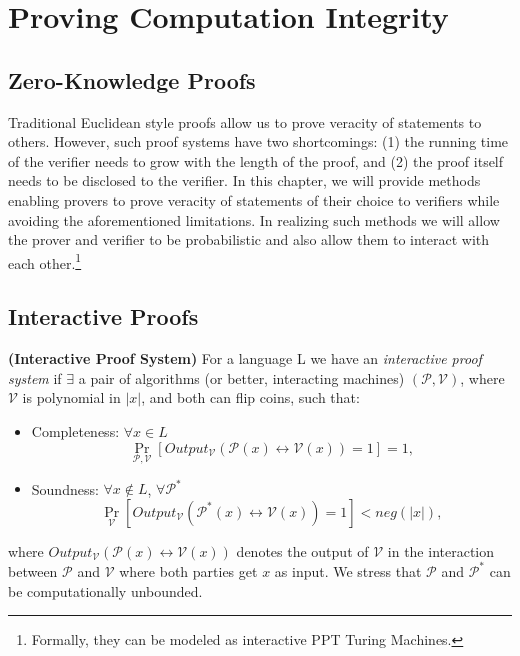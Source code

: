 \chapter{Proving Computation Integrity}
\section{Zero-Knowledge Proofs}
Traditional Euclidean style proofs allow us to prove veracity of statements to others. However, such proof systems have two shortcomings: (1) the running time of the verifier needs to grow with the length of the proof, and (2) the proof itself needs to be disclosed to the verifier. In this chapter, we will provide methods enabling provers to prove veracity of statements of their choice to verifiers while avoiding the aforementioned limitations. In realizing such methods we will allow the prover and verifier to be probabilistic and also allow them to interact with each other.\footnote{Formally, they can be modeled as interactive PPT Turing Machines.}

\section{Interactive Proofs}
\begin{definition} {\normalfont\textbf{(Interactive Proof System)}} For a language L we have an \textit{interactive proof system} if $\exists$ a pair of algorithms (or better, interacting machines) $(\mathcal{P},\mathcal{V})$, where $\mathcal{V}$ is polynomial in $|x|$, and both can flip coins, such that:
		\begin{itemize}
			\item Completeness: $\forall x\in L$
		$$\Pr_{\mathcal{P},\mathcal{V}} \left[Output_{\mathcal{V}}(\mathcal{P}(x) \leftrightarrow \mathcal{V}(x))=1\right]=1,$$
			\item Soundness: $\forall x\notin L$, $\forall \mathcal{P}^*$
		$$\Pr_{\mathcal{V}} \left[Output_{\mathcal{V}}(\mathcal{P}^*(x) \leftrightarrow \mathcal{V}(x))=1\right]<neg(|x|),$$
		\end{itemize} where $Output_{\mathcal{V}}(\mathcal{P}(x) \leftrightarrow \mathcal{V}(x))$ denotes the output of $\mathcal{V}$ in the interaction between $\mathcal{P}$ and $\mathcal{V}$ where both parties get $x$ as input.
		We stress that $\mathcal{P}$ and $\mathcal{P}^*$ can be computationally unbounded. 
  \end{definition}



